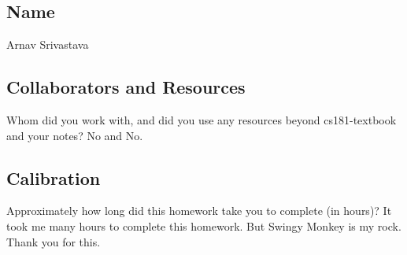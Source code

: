 \documentclass[submit]{harvardml}
\begin{document}
\newpage
\newpage
\newpage
\subsection*{Name}
Arnav Srivastava
\subsection*{Collaborators and Resources}
Whom did you work with, and did you use any resources beyond cs181-textbook and your notes?
No and No.
\subsection*{Calibration}
Approximately how long did this homework take you to complete (in hours)? 
It took me many hours to complete this homework. But Swingy Monkey is my rock. Thank you for this.
\end{document}
